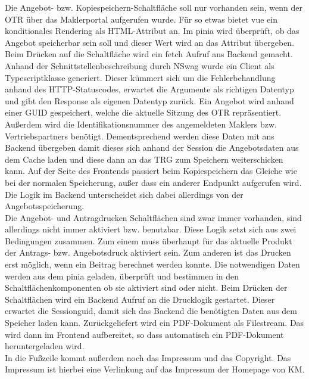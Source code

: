 Die Angebot- bzw. Kopiespeichern-Schaltfläche soll nur vorhanden sein, wenn der \ac{OTR} über das Maklerportal aufgerufen wurde. Für so etwas bietet \gls{vue} ein konditionales Rendering als \gls{HTML}-Attribut an. Im \gls{pinia} wird überprüft, ob das Angebot speicherbar sein soll und dieser Wert wird an das Attribut übergeben. Beim Drücken auf die Schaltfläche wird ein \gls{fetch} Aufruf ans Backend gemacht. Anhand der Schnittstellenbeschreibung durch \gls{NSwag} wurde ein Client als Typescriptklasse generiert. Dieser kümmert sich um die Fehlerbehandlung anhand des \gls{HTTP}-Statuscodes, erwartet die Argumente als richtigen Datentyp und gibt den Response als eigenen Datentyp zurück. Ein Angebot wird anhand einer \ac{GUID} gespeichert, welche die aktuelle Sitzung des \ac{OTR} repräsentiert. Außerdem wird die Identifikationsnummer des angemeldeten Maklers bzw. Vertriebspartners benötigt. Dementsprechend werden diese Daten mit ans Backend übergeben damit dieses sich anhand der Session die Angebotsdaten aus dem Cache laden und diese dann an das \ac{TRG} zum Speichern weiterschicken kann. Auf der Seite des Frontends passiert beim Kopiespeichern das Gleiche wie bei der normalen Speicherung, außer dass ein anderer Endpunkt aufgerufen wird. Die Logik im Backend unterscheidet sich dabei allerdings von der Angebotsspeicherung.\\

Die Angebot- und Antragdrucken Schaltflächen sind zwar immer vorhanden, sind allerdings nicht immer aktiviert bzw. benutzbar. Diese Logik setzt sich aus zwei Bedingungen zusammen. Zum einem muss überhaupt für das aktuelle Produkt der Antrags- bzw. Angebotsdruck aktiviert sein. Zum anderen ist das Drucken erst möglich, wenn ein Beitrag berechnet werden konnte. Die notwendigen Daten werden aus dem \gls{pinia} geladen, überprüft und bestimmen in den Schaltflächenkomponenten ob sie aktiviert sind oder nicht. Beim Drücken der Schaltflächen wird ein Backend Aufruf an die Drucklogik gestartet. Dieser erwartet die Sessionguid, damit sich das Backend die benötigten Daten aus dem Speicher laden kann. Zurückgeliefert wird ein PDF-Dokument als Filestream. Das wird dann im Frontend aufbereitet, so dass automatisch ein PDF-Dokument heruntergeladen wird.\\
In die Fußzeile kommt außerdem noch das Impressum und das Copyright. Das Impressum ist hierbei eine Verlinkung auf das Impressum der Homepage von \ac{KM}.
